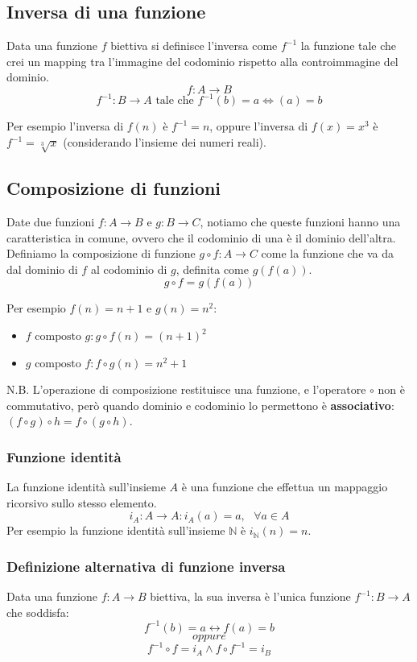 \documentclass{article}
\begin{document}
\subsection{Inversa di una funzione}
Data una funzione $f$ biettiva si definisce l'inversa come $f^{-1}$ la funzione tale che crei un mapping tra l'immagine del codominio rispetto alla controimmagine del dominio.
$$f:A\rightarrow B$$
$$f^{-1}:B\rightarrow A \text{ tale che } f^{-1}(b)=a \Longleftrightarrow (a)=b$$

Per esempio l'inversa di $f(n)$ è $f^{-1}=n$, oppure l'inversa di $f(x)=x^3$ è $f^{-1}=\sqrt[3]{x}$ (considerando l'insieme dei numeri reali).

\subsection{Composizione di funzioni}
Date due funzioni $f:A\rightarrow B$ e $g:B\rightarrow C$, notiamo che queste funzioni hanno una caratteristica in comune, ovvero che il codominio di una è il dominio dell'altra.
Definiamo la composizione di funzione $g\circ f:A\rightarrow C$ come la funzione che va da dal dominio di $f$ al codominio di $g$, definita come $g(f(a))$.
$$g\circ f=g(f(a))$$

Per esempio $f(n)=n+1 \text{ e } g(n)=n^2$:
\begin{itemize}
    \item $f \text{ composto } g: g\circ f(n)=(n+1)^2$
    \item $g \text{ composto } f: f\circ g(n)=n^2+1$
\end{itemize}

N.B. L'operazione di composizione restituisce una funzione, e l'operatore $\circ$ non è commutativo, però quando dominio e codominio lo permettono è \textbf{associativo}: $(f\circ g)\circ h=f\circ (g \circ h)$.

\subsubsection{Funzione identità}
La funzione identità sull'insieme $A$ è una funzione che effettua un mappaggio ricorsivo sullo stesso elemento.
$$i_A:A\rightarrow A : i_A(a)=a,\text{ }\forall a\in A$$
Per esempio la funzione identità sull'insieme $\mathbb{N}$ è $i_\mathbb{N}(n)=n$.

\subsubsection{Definizione alternativa di funzione inversa}
Data una funzione $f:A\rightarrow B$ biettiva, la sua inversa è l'unica funzione $f^{-1}:B\rightarrow A$ che soddisfa:
$$f^{-1}(b)=a \longleftrightarrow f(a)=b$$
$$oppure$$
$$f^{-1}\circ f=i_A \land f\circ f^{-1}=i_B$$
\end{document}
